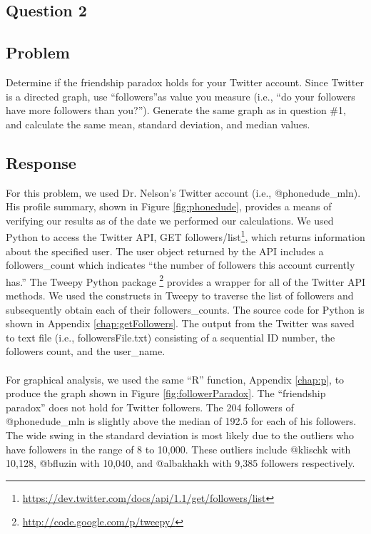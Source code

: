 \documentclass[letterpaper,11pt]{report}
\begin{document}
\begin{savenotes}
\section{Question 2}
\subsection{Problem}Determine if the friendship paradox holds for your Twitter account. Since Twitter is a directed graph, use ``followers''as value you measure (i.e., ``do your followers have more followers than you?''). Generate the same graph as in question \#1, and calculate the same mean, standard deviation, and median values.
\subsection{Response}For this problem, we used Dr. Nelson's Twitter account (i.e., @phonedude\_mln). His profile summary, shown in Figure \ref{fig:phonedude}, provides a means of verifying our results as of the date we performed our calculations. We used Python to access the Twitter API, GET followers/list\footnote{\url{https://dev.twitter.com/docs/api/1.1/get/followers/list}}, which returns information about the specified user. The user object returned by the API includes a followers\_count which indicates ``the number of followers this account currently has.'' The Tweepy Python package \footnote{\url{http://code.google.com/p/tweepy/}} provides a wrapper for all of the Twitter API methods. We used the constructs in Tweepy to traverse the list of followers and subsequently obtain each of their followers\_counts. The source code for Python is shown in Appendix \ref{chap:getFollowers}. The output from the Twitter was saved to text file (i.e., followersFile.txt) consisting of a sequential ID number, the followers count, and the user\_name.

\paragraph{}For graphical analysis, we used the same ``R'' function, Appendix \ref{chap:p}, to produce the graph shown in Figure \ref{fig:followerParadox}. The ``friendship paradox'' does not hold for Twitter followers. The 204 followers of @phonedude\_mln is slightly above the median of 192.5 for each of his followers. The wide swing in the standard deviation is most likely due to the outliers who have followers in the range of 8 to 10,000. These outliers include @klischk with 10,128, @bfluzin with 10,040, and @albakhakh with 9,385 followers respectively.


\end{savenotes}
\end{document}
